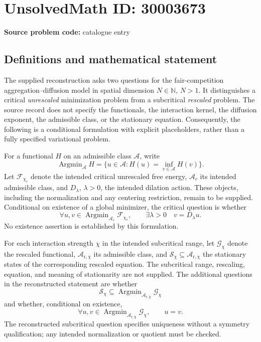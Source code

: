\documentclass[11pt]{article}
\newcommand{\N}{\mathbb{N}}
\begin{document}
\section*{UnsolvedMath ID: 30003673}
\textbf{Source problem code:} catalogue entry
\subsection{Definitions and mathematical statement}
The supplied reconstruction asks two questions for the fair-competition aggregation--diffusion model in spatial dimension \(N\in\N\), \(N>1\). It distinguishes a critical \emph{unrescaled} minimization problem from a subcritical \emph{rescaled} problem. The source record does not specify the functionals, the interaction kernel, the diffusion exponent, the admissible class, or the stationary equation. Consequently, the following is a conditional formulation with explicit placeholders, rather than a fully specified variational problem.

For a functional \(H\) on an admissible class \(\mathcal A\), write
\[
\operatorname{Argmin}_{\mathcal A}H
 =\{u\in\mathcal A:H(u)=\inf_{v\in\mathcal A}H(v)\}.
\]
Let \(\mathcal F_{\chi_c}\) denote the intended critical unrescaled free energy, \(\mathcal A_c\) its intended admissible class, and \(D_\lambda\), \(\lambda>0\), the intended dilation action. These objects, including the normalization and any centering restriction, remain to be supplied. Conditional on existence of a global minimizer, the critical question is whether
\[
\forall u,v\in\operatorname{Argmin}_{\mathcal A_c}\mathcal F_{\chi_c},
\qquad \exists\lambda>0\quad v=D_\lambda u.
\]
No existence assertion is established by this formulation.

For each interaction strength \(\chi\) in the intended subcritical range, let \(\mathcal G_\chi\) denote the rescaled functional, \(\mathcal A_{\mathrm r,\chi}\) its admissible class, and \(\mathcal S_\chi\subseteq\mathcal A_{\mathrm r,\chi}\) the stationary states of the corresponding rescaled equation. The subcritical range, rescaling, equation, and meaning of stationarity are not supplied. The additional questions in the reconstructed statement are whether
\[
\mathcal S_\chi\subseteq
\operatorname{Argmin}_{\mathcal A_{\mathrm r,\chi}}\mathcal G_\chi
\]
and whether, conditional on existence,
\[
\forall u,v\in
\operatorname{Argmin}_{\mathcal A_{\mathrm r,\chi}}\mathcal G_\chi,
\qquad u=v.
\]
The reconstructed subcritical question specifies uniqueness without a symmetry qualification; any intended normalization or quotient must be checked.
\end{document}

